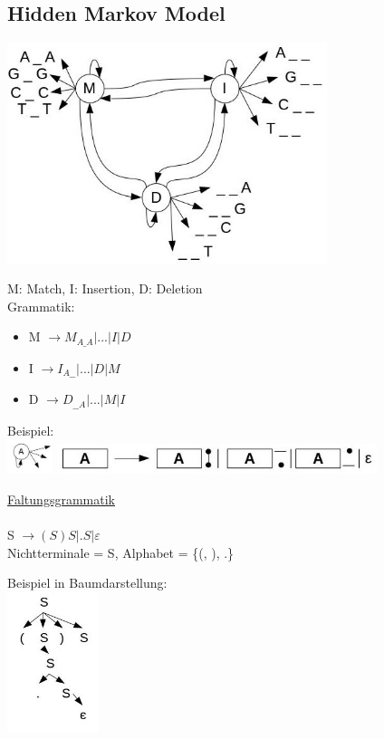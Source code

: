 \subsection{Hidden Markov Model}

\includegraphics[width=0.7\textwidth]{lectures/160523_2/pix/7.jpg}

M: Match, I: Insertion, D: Deletion\\

Grammatik:
\begin{itemize}
	\item M $\to M_{A\_A} | ... | I | D$
	\item I $\to I_{A\_\_} | ... | D | M$
	\item D $\to D_{\_\_A} | ... | M | I$
\end{itemize}

Beispiel:\\
\includegraphics[width=0.1\textwidth]{lectures/160523_2/pix/8.jpg}
\includegraphics[width=0.7\textwidth]{lectures/160523_2/pix/9.jpg}

\underline{Faltungsgrammatik}\\\\
S $\to (S)S | .S| \varepsilon$\\
Nichtterminale = S, Alphabet = \{(, ), .\}\\

\newpage

Beispiel in Baumdarstellung:\\
\includegraphics[width=0.2\textwidth]{lectures/160523_2/pix/10.jpg}

